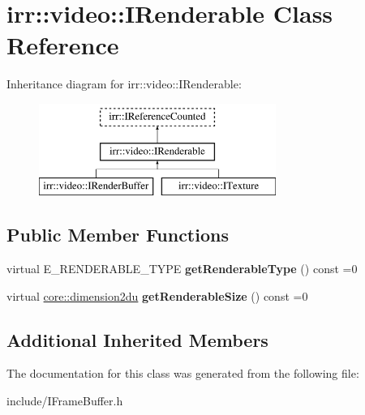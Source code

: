 \hypertarget{classirr_1_1video_1_1IRenderable}{}\section{irr\+:\+:video\+:\+:I\+Renderable Class Reference}
\label{classirr_1_1video_1_1IRenderable}
Inheritance diagram for irr\+:\+:video\+:\+:I\+Renderable\+:\begin{figure}[H]
\begin{center}
\leavevmode
\includegraphics[height=3.000000cm]{classirr_1_1video_1_1IRenderable}
\end{center}
\end{figure}
\subsection*{Public Member Functions}
\begin{DoxyCompactItemize}
\item 
virtual E\+\_\+\+R\+E\+N\+D\+E\+R\+A\+B\+L\+E\+\_\+\+T\+Y\+PE {\bfseries get\+Renderable\+Type} () const  =0\hypertarget{classirr_1_1video_1_1IRenderable_a9b5d286db913e2ea03e96c711ab6c43d}{}\label{classirr_1_1video_1_1IRenderable_a9b5d286db913e2ea03e96c711ab6c43d}

\item 
virtual \hyperlink{namespaceirr_1_1core_ad2e562e3219072e2f7fc7c2bba0ef0cb}{core\+::dimension2du} {\bfseries get\+Renderable\+Size} () const  =0\hypertarget{classirr_1_1video_1_1IRenderable_a60273d8de41fd71211ca7e34aabf0680}{}\label{classirr_1_1video_1_1IRenderable_a60273d8de41fd71211ca7e34aabf0680}

\end{DoxyCompactItemize}
\subsection*{Additional Inherited Members}


The documentation for this class was generated from the following file\+:\begin{DoxyCompactItemize}
\item 
include/I\+Frame\+Buffer.\+h\end{DoxyCompactItemize}
